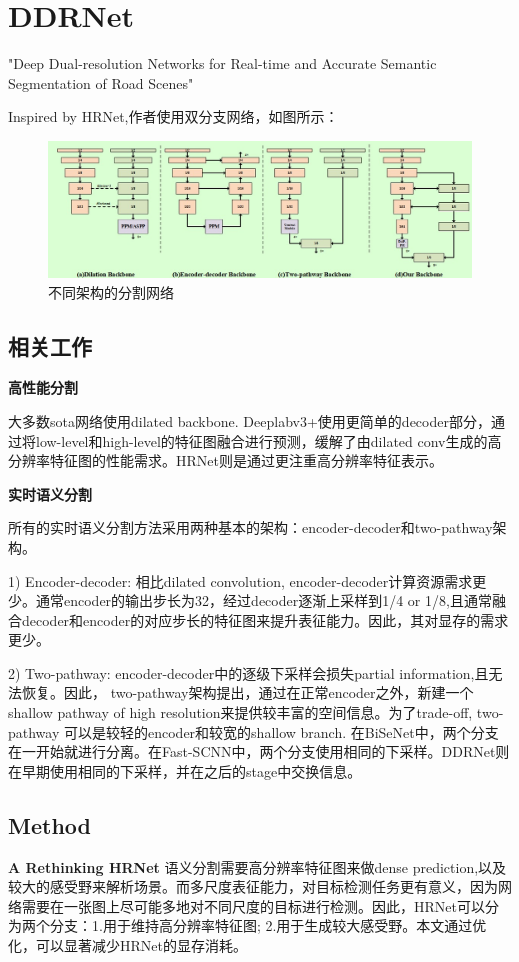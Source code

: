 \documentclass{article}
\begin{document}
\section{DDRNet}
"Deep Dual-resolution Networks for Real-time and Accurate Semantic Segmentation of Road Scenes"

Inspired by HRNet,作者使用双分支网络，如图所示：
\begin{figure}[htbp]
\centering
\includegraphics[scale=0.3]{image/DDR_arch.jpg}
\caption{不同架构的分割网络}
\label{Fig.ddr_arch}
\end{figure}
\subsection{相关工作}
\textbf{高性能分割}

大多数sota网络使用dilated backbone. Deeplabv3+使用更简单的decoder部分，通过将low-level和high-level的特征图融合进行预测，缓解了由dilated conv生成的高分辨率特征图的性能需求。HRNet则是通过更注重高分辨率特征表示。

\textbf{实时语义分割}

所有的实时语义分割方法采用两种基本的架构：encoder-decoder和two-pathway架构。

1) Encoder-decoder: 相比dilated convolution, encoder-decoder计算资源需求更少。通常encoder的输出步长为32，经过decoder逐渐上采样到1/4 or 1/8,且通常融合decoder和encoder的对应步长的特征图来提升表征能力。因此，其对显存的需求更少。

2) Two-pathway: encoder-decoder中的逐级下采样会损失partial information,且无法恢复。因此， two-pathway架构提出，通过在正常encoder之外，新建一个shallow pathway of high resolution来提供较丰富的空间信息。为了trade-off, two-pathway 可以是较轻的encoder和较宽的shallow branch. 在BiSeNet中，两个分支在一开始就进行分离。在Fast-SCNN中，两个分支使用相同的下采样。DDRNet则在早期使用相同的下采样，并在之后的stage中交换信息。

\subsection{Method}
\textbf{A Rethinking HRNet}
语义分割需要高分辨率特征图来做dense prediction,以及较大的感受野来解析场景。而多尺度表征能力，对目标检测任务更有意义，因为网络需要在一张图上尽可能多地对不同尺度的目标进行检测。因此，HRNet可以分为两个分支：1.用于维持高分辨率特征图; 2.用于生成较大感受野。本文通过优化，可以显著减少HRNet的显存消耗。
\end{document}
